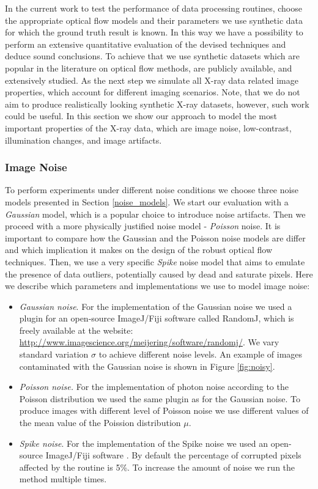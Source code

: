 In the current work to test the performance of data processing routines, choose the appropriate optical flow models and their parameters we use synthetic data for which the ground truth result is known. In this way we have a possibility to perform an extensive quantitative evaluation of the devised techniques and deduce sound conclusions.  To achieve that we use synthetic datasets which are popular in the literature on optical flow methods, are publicly available, and extensively studied. As the next step we simulate all X-ray data related image properties, which account for different imaging scenarios. Note, that we do not aim to produce realistically looking synthetic X-ray datasets, however, such work could be useful. In this section we show our approach to model the most important properties of the X-ray data, which are image noise, low-contrast, illumination changes, and image artifacts.


\subsubsection{Image Noise}
\label{modeling_image_noise}

To perform experiments under different noise conditions we choose three noise models presented in Section \ref{noise_models}.
We start our evaluation with a \textit{Gaussian} model, which is a popular choice to introduce noise artifacts. Then we proceed with a more physically justified noise model - \textit{Poisson} noise. It is important to compare how the Gaussian and the Poisson noise models are differ and which implication it makes on the design of the robust optical flow techniques.
Then, we use a very specific \textit{Spike} noise model that aims to emulate the presence of data outliers, potentially caused by dead and saturate pixels. 
Here we describe which parameters and implementations we use to model image noise:

\begin{itemize}
	\item \textit{Gaussian noise}. For the implementation of
	 the Gaussian noise we used a plugin for an open-source ImageJ/Fiji software \cite{Schindelin12, Schneider12} called RandomJ, which is freely available at the website: \url{http://www.imagescience.org/meijering/software/randomj/}. We vary standard variation $\sigma$ to achieve different noise levels. An example of images contaminated with the  Gaussian noise is shown in Figure \ref{fig:noisy}.
	
	\item \textit{Poisson noise.}  For the implementation of photon noise according to the Poisson distribution we used the same plugin as for the Gaussian noise. To produce images with different level of Poisson noise we use different values of the mean value of the Poission distribution $\mu$.
	
	\item \textit{Spike noise}. For the implementation of the Spike noise we  used an open-source ImageJ/Fiji software \cite{Schindelin12, Schneider12}. By default the percentage of corrupted pixels affected by the routine is 5\%. To increase the amount of noise we run the method multiple times. 
\end{itemize}


